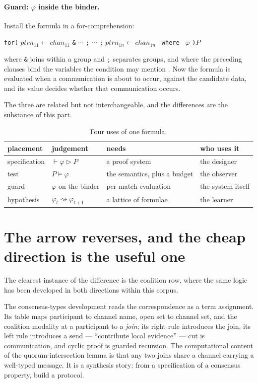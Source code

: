 \paragraph{Guard: $\varphi$ inside the binder.} Install the formula in a
for-comprehension:
\begin{center}
\texttt{for(} $ptrn_{11} \leftarrow chan_{11}$ \texttt{\&} $\cdots$ \texttt{;}
$\cdots$ \texttt{;} $ptrn_{1n} \leftarrow chan_{1n}$ \texttt{ where } $\varphi$
\texttt{)}$P$
\end{center}
where \texttt{\&} joins within a group and \texttt{;} separates groups, and where
the preceding clauses bind the variables the condition may mention
\cite{GsltOmnibus}. Now the formula is evaluated when a communication is about to
occur, against the candidate data, and its value decides whether that
communication occurs.

The three are related but not interchangeable, and the differences are the
substance of this part.

\begin{table}[h]
\centering
\small
\renewcommand{\arraystretch}{1.3}
\begin{tabular}{@{}llll@{}}
\toprule
placement & judgement & needs & who uses it \\
\midrule
specification & $\vdash \varphi \triangleright P$ & a proof system & the designer \\
test          & $P \models \varphi$ & the semantics, plus a budget & the observer \\
guard         & $\varphi$ on the binder & per-match evaluation & the system itself \\
hypothesis    & $\varphi_{t} \rightsquigarrow \varphi_{t+1}$ & a lattice of formulae & the learner \\
\bottomrule
\end{tabular}
\caption{Four uses of one formula.}
\label{tab:placements}
\end{table}

\section{The arrow reverses, and the cheap direction is the useful one}
\label{sec:reversal}

The clearest instance of the difference is the coalition row, where the same logic
has been developed in both directions within this corpus.

The consensus-types development \cite{ConsensusTypes} reads the correspondence as
a term assignment. Its table maps participant to channel name, open set to channel
set, and the coalition modality at a participant to a \emph{join}; its right rule
introduces the join, its left rule introduces a send --- ``contribute local
evidence'' --- cut is communication, and cyclic proof is guarded recursion. The
computational content of the quorum-intersection lemma is that any two joins share
a channel carrying a well-typed message. It is a synthesis story: from a
specification of a consensus property, build a protocol.

